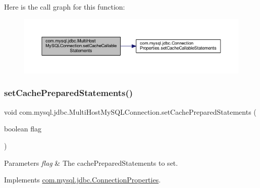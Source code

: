 Here is the call graph for this function\+:
\nopagebreak
\begin{figure}[H]
\begin{center}
\leavevmode
\includegraphics[width=350pt]{classcom_1_1mysql_1_1jdbc_1_1_multi_host_my_s_q_l_connection_a2d8108c12a82b35523797323427b3b45_cgraph}
\end{center}
\end{figure}
\mbox{\label{classcom_1_1mysql_1_1jdbc_1_1_multi_host_my_s_q_l_connection_a867db979855487f8231b63c63c2f1172}} 
\subsubsection{\texorpdfstring{set\+Cache\+Prepared\+Statements()}{setCachePreparedStatements()}}
{\footnotesize\ttfamily void com.\+mysql.\+jdbc.\+Multi\+Host\+My\+S\+Q\+L\+Connection.\+set\+Cache\+Prepared\+Statements (\begin{DoxyParamCaption}\item[{boolean}]{flag }\end{DoxyParamCaption})}


\begin{DoxyParams}{Parameters}
{\em flag} & The cache\+Prepared\+Statements to set. \\
\hline
\end{DoxyParams}


Implements \mbox{\hyperlink{interfacecom_1_1mysql_1_1jdbc_1_1_connection_properties_a990fe5790551ed49878ecc8bceb750a5}{com.\+mysql.\+jdbc.\+Connection\+Properties}}.

